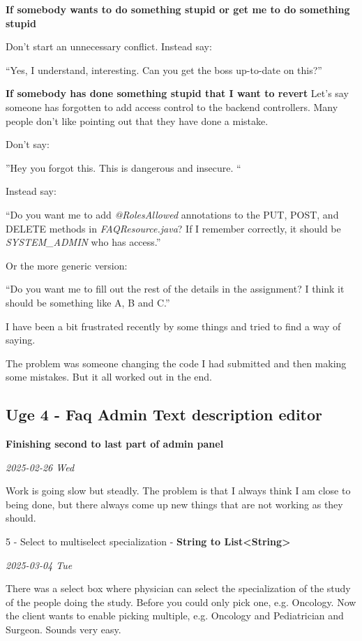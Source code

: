 \documentclass[../main.tex]{subfiles}
\begin{document}
\textbf{If somebody wants to do something stupid or get me to do
something stupid}

Don't start an unnecessary conflict. Instead say:

``Yes, I understand, interesting. Can you get the boss up-to-date on
this?''

\textbf{If somebody has done something stupid that I want to revert} Let's say someone has forgotten to add access control to the backend controllers. Many people don't like pointing out that they have done a mistake.

Don't say:

''Hey you forgot this. This is dangerous and insecure. ``

Instead say:

``Do you want me to add \emph{@RolesAllowed} annotations to the PUT, POST, and DELETE methods in \emph{FAQResource.java}? If I remember correctly, it should be \emph{SYSTEM\_ADMIN} who has access.''

Or the more generic version:

``Do you want me to fill out the rest of the details in the assignment? I think it should be something like A, B and C.''

I have been a bit frustrated recently by some things and tried to find a way of saying.

The problem was someone changing the code I had submitted and then making some mistakes. But it all worked out in the end. 

\subsection{Uge 4 - Faq Admin Text description editor} \textbf{Finishing second to last part of admin panel}

\textit{2025-02-26 Wed}

Work is going slow but steadly. The problem is that I always think I am
close to being done, but there always come up new things that are not
working as they should. 

5 - Select to multiselect specialization - \textbf{String to
List\textless String\textgreater{}}

\textit{2025-03-04 Tue}

There was a select box where physician can select the specialization of the study of the people doing the study. Before you could only pick one, e.g. Oncology. Now the client wants to enable picking multiple, e.g. Oncology and Pediatrician and Surgeon. Sounds very easy.
\end{document}

